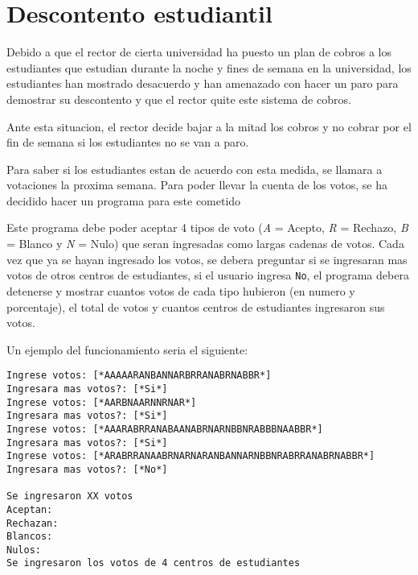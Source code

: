 
\section{Descontento estudiantil}

Debido a que el rector de cierta universidad ha puesto un plan de cobros a los estudiantes que estudian durante la noche y fines de semana en la universidad, los estudiantes han mostrado desacuerdo y han amenazado con hacer un paro para demostrar su descontento y que el rector quite este sistema de cobros.

Ante esta situacion, el rector decide bajar a la mitad los cobros y no cobrar por el fin de semana si los estudiantes no se van a paro.

Para saber si los estudiantes estan de acuerdo con esta medida, se llamara a votaciones la proxima semana. Para poder llevar la cuenta de los votos, se ha decidido hacer un programa para este cometido

Este programa debe poder aceptar 4 tipos de voto (\textit{A} = Acepto, \textit{R} = Rechazo, \textit{B} = Blanco y \textit{N} = Nulo) que seran ingresadas como largas cadenas de votos. Cada vez que ya se hayan ingresado los votos, se debera preguntar si se ingresaran mas votos de otros centros de estudiantes, si el usuario ingresa \texttt{No}, el programa debera detenerse y mostrar cuantos votos de cada tipo hubieron (en numero y porcentaje), el total de votos y cuantos centros de estudiantes ingresaron sus votos.

Un ejemplo del funcionamiento seria el siguiente:

\begin{lstlisting}[style=consola]
Ingrese votos: [*AAAAARANBANNARBRRANABRNABBR*]
Ingresara mas votos?: [*Si*]
Ingrese votos: [*AARBNAARNNRNAR*]
Ingresara mas votos?: [*Si*]
Ingrese votos: [*AAARABRRANABAANABRNARNBBNRABBBNAABBR*]
Ingresara mas votos?: [*Si*]
Ingrese votos: [*ARABRRANAABRNARNARANBANNARNBBNRABRRANABRNABBR*]
Ingresara mas votos?: [*No*]

Se ingresaron XX votos
Aceptan:
Rechazan:
Blancos:
Nulos:
Se ingresaron los votos de 4 centros de estudiantes
\end{lstlisting}

\newpage